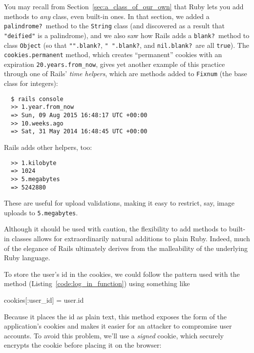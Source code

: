 \begin{aside}
\label{aside:time_helpers}

You may recall from Section~\ref{sec:a_class_of_our_own} that Ruby lets you add methods to \emph{any} class, even built-in ones. In that section, we added a \texttt{palindrome?}\ method to the \texttt{String} class (and discovered as a result that \texttt{"deified"} is a palindrome), and we also saw how Rails adds a \texttt{blank?}\ method to class \texttt{Object} (so that \texttt{"".blank?}, \texttt{"~".blank?}, and \texttt{nil.blank?}\ are all \texttt{true}). The \texttt{cookies.permanent} method, which creates ``permanent'' cookies with an expiration \texttt{20.years.from\_now}, gives yet another example of this practice through one of Rails' \emph{time helpers}, which are methods added to \texttt{Fixnum} (the base class for integers):

\begin{verbatim}
  $ rails console
  >> 1.year.from_now
  => Sun, 09 Aug 2015 16:48:17 UTC +00:00
  >> 10.weeks.ago
  => Sat, 31 May 2014 16:48:45 UTC +00:00
\end{verbatim}

\noindent Rails adds other helpers, too:

\begin{verbatim}
  >> 1.kilobyte
  => 1024
  >> 5.megabytes
  => 5242880
\end{verbatim}

\noindent These are useful for upload validations, making it easy to restrict, say, image uploads to \texttt{5.megabytes}.

Although it should be used with caution, the flexibility to add methods to built-in classes allows for extraordinarily natural additions to plain Ruby. Indeed, much of the elegance of Rails ultimately derives from the malleability of the underlying Ruby language.

\end{aside}

To store the user's id in the cookies, we could follow the pattern used with the  method (Listing~\ref{code:log_in_function}) using something like

\begin{code}
cookies[:user_id] = user.id
\end{code}

\noindent Because it places the id as plain text, this method exposes the form of the application's cookies and makes it easier for an attacker to compromise user accounts. To avoid this problem, we'll use a \emph{signed} cookie, which securely encrypts the cookie before placing it on the browser:

